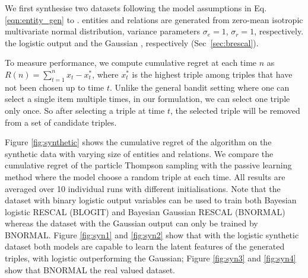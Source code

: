We first synthesise two datasets 
following the model assumptions in Eq. \ref{eqn:entity_gen} to 
\verify{\ref{eqn:triple_gen}}. 
entities and relations are generated from zero-mean isotropic multivariate normal distribution,  
variance parameters $\sigma_e=1$, $\sigma_r=1$, respectively.
 the logistic output and the Gaussian , respectively (Sec~\ref{sec:brescal}). 

To measure performance, we compute cumulative regret 
at each time $n$ as $R(n) = \sum_{t=1}^{n} x_t - x^{*}_t$, 
where $x^*_t$ is the highest triple among triples that have not been chosen up to time $t$. Unlike the general 
bandit setting where one can select a single item multiple times, in our formulation, we can select one triple 
only once. So after selecting a triple at time $t$, the selected triple will be removed from a set of candidate 
triples.

Figure \ref{fig:synthetic} shows the cumulative regret of the algorithm on the synthetic data with varying size of 
entities and relations. We compare the cumulative regret of the particle Thompson sampling with the passive 
learning method where the model choose a random triple at each time. All results are averaged over 10 
individual runs with different initialisations. 
Note that the dataset with binary logistic output variables can be used to train both Bayesian logistic RESCAL (BLOGIT) and Bayesian Gaussian RESCAL (BNORMAL) whereas the dataset with the Gaussian output can only be trained by BNORMAL.
Figure \ref{fig:syn1} and \ref{fig:syn2} show that with the logistic synthetic dataset both models are capable to learn the latent features of the generated triples, with logistic outperforming the Gaussian; Figure \ref{fig:syn3} and \ref{fig:syn4} show that BNORMAL  the real valued dataset. 

